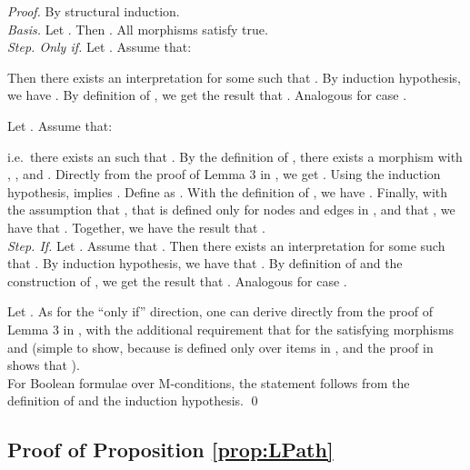 \documentclass{llncs}
\begin{document}
	\begin{proof}
		By structural induction.\\

		\noindent \emph{Basis.} Let . Then . All morphisms satisfy true.\\

		\noindent \emph{Step. Only if.} Let . Assume that:
		
		
		\noindent Then there exists an interpretation  for some  such that . By induction hypothesis, we have . By definition of , we get the result that . Analogous for case .

		Let . Assume that:
		
		
		\noindent i.e.\ there exists an  such that . By the definition of , there exists a morphism  with , , and . Directly from the proof of Lemma 3 in \cite{Habel-Pennemann09a}, we get . Using the induction hypothesis,  implies . Define  as . With the definition of , we have . Finally, with the assumption that , that  is defined only for nodes and edges in , and that , we have that . Together, we have the result that .\\

		\noindent \emph{Step. If.} Let . Assume that . Then there exists an interpretation  for some  such that . By induction hypothesis, we have that . By definition of  and the construction of , we get the result that . Analogous for case .

		Let . As for the ``only if'' direction, one can derive  directly from the proof of Lemma 3 in \cite{Habel-Pennemann09a}, with the additional requirement that  for the satisfying morphisms  and  (simple to show, because  is defined only over items in , and the proof in \cite{Habel-Pennemann09a} shows that ).\\

		For Boolean formulae over M-conditions, the statement follows from the definition of  and the induction hypothesis.
		\qed
	\end{proof}
	
	
	
	
	
	
	\newpage\subsection{Proof of Proposition \ref{prop:LPath}}\label{prop:LPath:PROOF}
	
\end{document}
